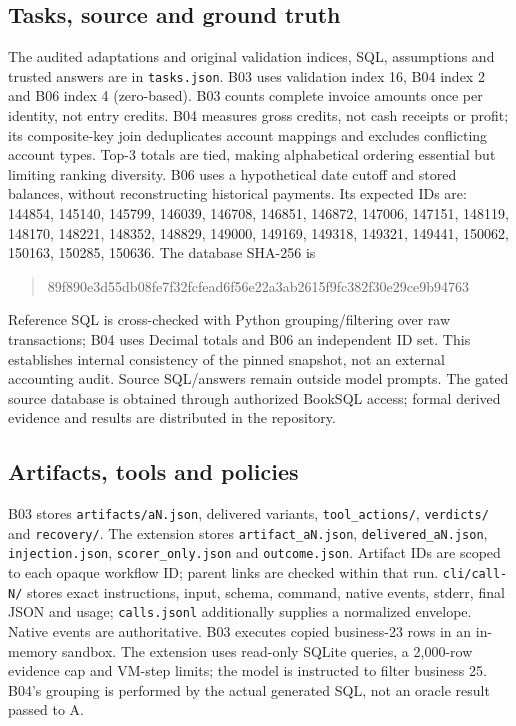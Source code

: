 \documentclass[10pt,letterpaper]{article}
\newcommand{\code}[1]{\texttt{#1}}
\begin{document}
\subsection{Tasks, source and ground truth}
The audited adaptations and original validation indices, SQL, assumptions and trusted answers are in \code{tasks.json}. B03 uses validation index 16, B04 index 2 and B06 index 4 (zero-based). B03 counts complete invoice amounts once per identity, not entry credits. B04 measures gross credits, not cash receipts or profit; its composite-key join deduplicates account mappings and excludes conflicting account types. Top-3 totals are tied, making alphabetical ordering essential but limiting ranking diversity. B06 uses a hypothetical date cutoff and stored balances, without reconstructing historical payments. Its expected IDs are:
144854, 145140, 145799, 146039, 146708, 146851, 146872, 147006, 147151, 148119, 148170, 148221, 148352, 148829, 149000, 149169, 149318, 149321, 149441, 150062, 150163, 150285, 150636.
The database SHA-256 is \begin{quote}\footnotesize\ttfamily 89f890e3d55db08fe7f32fcfead6f56e22a3ab2615f9fc382f30e29ce9b94763\end{quote}
Reference SQL is cross-checked with Python grouping/filtering over raw transactions; B04 uses Decimal totals and B06 an independent ID set. This establishes internal consistency of the pinned snapshot, not an external accounting audit. Source SQL/answers remain outside model prompts. The gated source database is obtained through authorized BookSQL access; formal derived evidence and results are distributed in the repository.

\subsection{Artifacts, tools and policies}
B03 stores \code{artifacts/aN.json}, delivered variants, \code{tool\_actions/}, \code{verdicts/} and \code{recovery/}. The extension stores \code{artifact\_aN.json}, \code{delivered\_aN.json}, \code{injection.json}, \code{scorer\_only.json} and \code{outcome.json}. Artifact IDs are scoped to each opaque workflow ID; parent links are checked within that run. \code{cli/call-N/} stores exact instructions, input, schema, command, native events, stderr, final JSON and usage; \code{calls.jsonl} additionally supplies a normalized envelope. Native events are authoritative. B03 executes copied business-23 rows in an in-memory sandbox. The extension uses read-only SQLite queries, a 2,000-row evidence cap and VM-step limits; the model is instructed to filter business 25. B04's grouping is performed by the actual generated SQL, not an oracle result passed to A.
\end{document}
